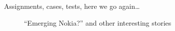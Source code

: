 \begin{post}
	\begin{content}
Assignments, cases, tests, here we go again\ldots

\begin{figure}[h]
\begin{center}
\caption*{``Emerging Nokia?'' and other interesting stories}
\end{center}
\end{figure}

\end{content}
\end{post}
